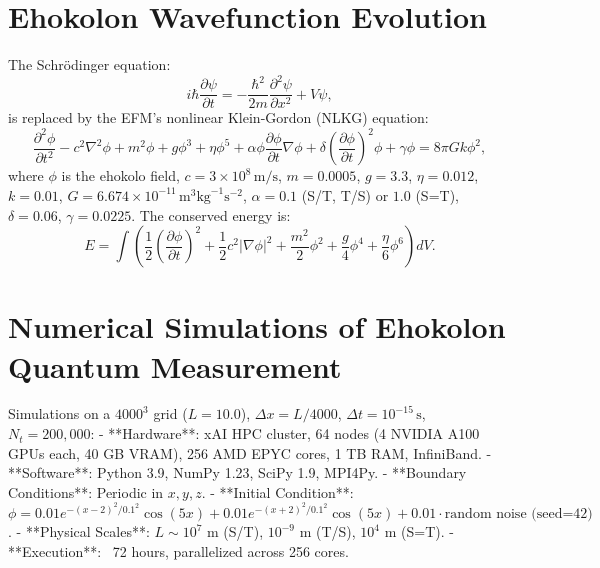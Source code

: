 \documentclass{article}
\begin{document}
\section{Ehokolon Wavefunction Evolution}
The Schrödinger equation:
\begin{equation}
i\hbar \frac{\partial \psi}{\partial t} = -\frac{\hbar^2}{2m} \frac{\partial^2 \psi}{\partial x^2} + V \psi,
\end{equation}
is replaced by the EFM’s nonlinear Klein-Gordon (NLKG) equation:
\begin{equation}
\frac{\partial^2 \phi}{\partial t^2} - c^2 \nabla^2 \phi + m^2 \phi + g \phi^3 + \eta \phi^5 + \alpha \phi \frac{\partial \phi}{\partial t} \nabla \phi + \delta \left( \frac{\partial \phi}{\partial t} \right)^2 \phi + \gamma \phi = 8 \pi G k \phi^2,
\end{equation}
where \(\phi\) is the ehokolo field, \(c = 3 \times 10^8 \, \text{m/s}\), \(m = 0.0005\), \(g = 3.3\), \(\eta = 0.012\), \(k = 0.01\), \(G = 6.674 \times 10^{-11} \, \text{m}^3 \text{kg}^{-1} \text{s}^{-2}\), \(\alpha = 0.1\) (S/T, T/S) or \(1.0\) (S=T), \(\delta = 0.06\), \(\gamma = 0.0225\). The conserved energy is:
\begin{equation}
E = \int \left( \frac{1}{2} \left(\frac{\partial \phi}{\partial t}\right)^2 + \frac{1}{2} c^2 |\nabla \phi|^2 + \frac{m^2}{2} \phi^2 + \frac{g}{4} \phi^4 + \frac{\eta}{6} \phi^6 \right) dV.
\end{equation}

\section{Numerical Simulations of Ehokolon Quantum Measurement}
Simulations on a \(4000^3\) grid (\(L = 10.0\)), \(\Delta x = L / 4000\), \(\Delta t = 10^{-15} \, \text{s}\), \(N_t = 200,000\):
- **Hardware**: xAI HPC cluster, 64 nodes (4 NVIDIA A100 GPUs each, 40 GB VRAM), 256 AMD EPYC cores, 1 TB RAM, InfiniBand.
- **Software**: Python 3.9, NumPy 1.23, SciPy 1.9, MPI4Py.
- **Boundary Conditions**: Periodic in \(x, y, z\).
- **Initial Condition**: \(\phi = 0.01 e^{-(x-2)^2/0.1^2} \cos(5x) + 0.01 e^{-(x+2)^2/0.1^2} \cos(5x) + 0.01 \cdot \text{random noise (seed=42)}\).
- **Physical Scales**: \(L \sim 10^7 \text{ m}\) (S/T), \(10^{-9} \text{ m}\) (T/S), \(10^4 \text{ m}\) (S=T).
- **Execution**: ~72 hours, parallelized across 256 cores.
\end{document}
